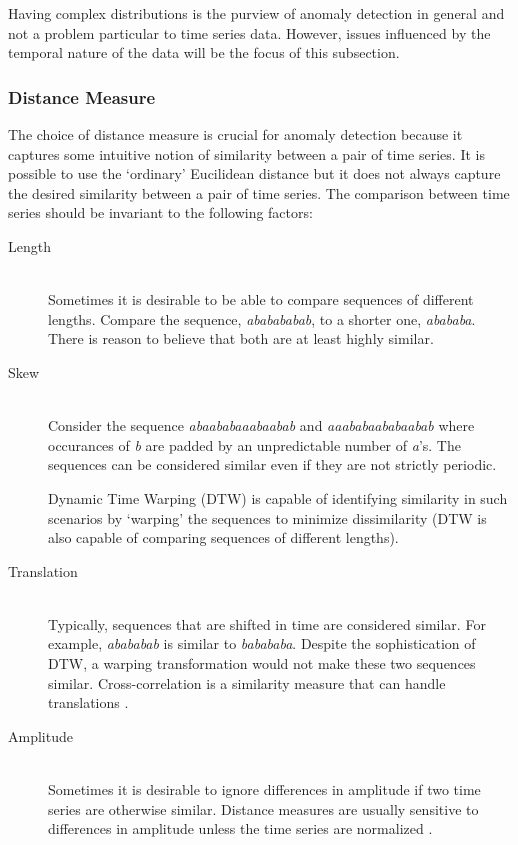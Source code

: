 Having complex distributions is the purview of anomaly detection in general and not a problem particular to time series data. However, issues influenced by the temporal nature of the data will be the focus of this subsection.

\subsubsection{Distance Measure}%

The choice of distance measure is crucial for anomaly detection because it captures some intuitive notion of similarity between a pair of time series. It is possible to use the `ordinary' Eucilidean distance \cite{Keogh2002} but it does not always capture the desired similarity between a pair of time series. The comparison between time series should be invariant to the following factors:

\begin{description}

\item[Length]  \hfill \\
%
Sometimes it is desirable to be able to compare sequences of different lengths. Compare the sequence, \emph{ababababab}, to a shorter one, \emph{abababa}. There is reason to believe that both are at least highly similar.

\item[Skew] \hfill \\
%
Consider the sequence \emph{abaababaaabaabab} and \emph{aaababaababaabab} where occurances of \emph{b} are padded by an unpredictable number of \emph{a}'s. The sequences can be considered similar even if they are not strictly periodic.

Dynamic Time Warping (DTW) \cite{Keogh2002} is capable of identifying similarity in such scenarios by `warping' the sequences to minimize dissimilarity (DTW is also capable of comparing sequences of different lengths).

\item[Translation] \hfill \\
%
Typically, sequences that are shifted in time are considered similar. For example, \emph{abababab} is similar to \emph{babababa}. Despite the sophistication of DTW, a warping transformation would not make these two sequences similar.  Cross-correlation is a similarity measure that can handle translations \cite{Protopapas2005}.

\item[Amplitude] \hfill \\
%
Sometimes it is desirable to ignore differences in amplitude if two time series are otherwise similar. Distance measures are usually sensitive to differences in amplitude unless the time series are normalized \cite{Keogh2002}. 

\end{description}

